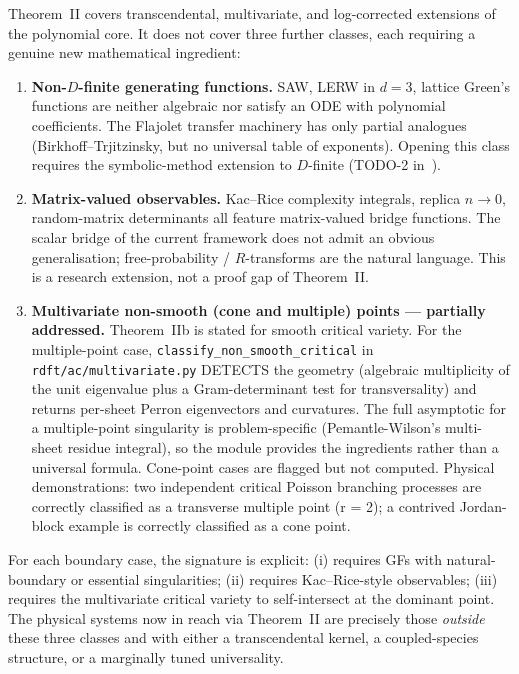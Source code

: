 \documentclass[11pt,a4paper]{article}
\theoremstyle{plain}
\theoremstyle{definition}
\begin{document}
Theorem~II covers transcendental, multivariate, and log-corrected
extensions of the polynomial core.  It does not cover three further
classes, each requiring a genuine new mathematical ingredient:

\begin{enumerate}[label=(\roman*), leftmargin=1.8em, itemsep=2pt]
  \item \textbf{Non-$D$-finite generating functions.}  SAW, LERW
    in $d=3$, lattice Green's functions are neither algebraic nor
    satisfy an ODE with polynomial coefficients.  The Flajolet
    transfer machinery has only partial analogues
    (Birkhoff--Trjitzinsky, but no universal table of exponents).
    Opening this class requires the symbolic-method extension to
    $D$-finite (TODO-2 in~\citep{AmarteifioProblems2026}).

  \item \textbf{Matrix-valued observables.}  Kac--Rice complexity
    integrals, replica $n \to 0$, random-matrix determinants all
    feature matrix-valued bridge functions.  The scalar bridge of
    the current framework does not admit an obvious generalisation;
    free-probability / $R$-transforms are the natural language.  This
    is a research extension, not a proof gap of Theorem~II.

  \item \textbf{Multivariate non-smooth (cone and multiple) points ---
    partially addressed.}  Theorem~IIb is stated for smooth critical
    variety.  For the multiple-point case, \texttt{classify\_non\_smooth\_critical}
    in \texttt{rdft/ac/multivariate.py} DETECTS the geometry (algebraic
    multiplicity of the unit eigenvalue plus a Gram-determinant test for
    transversality) and returns per-sheet Perron eigenvectors and
    curvatures.  The full asymptotic for a multiple-point singularity
    is problem-specific (Pemantle-Wilson's multi-sheet residue integral),
    so the module provides the ingredients rather than a universal
    formula.  Cone-point cases are flagged but not computed.  Physical
    demonstrations: two independent critical Poisson branching
    processes are correctly classified as a transverse multiple point
    (r = 2); a contrived Jordan-block example is correctly classified
    as a cone point.
\end{enumerate}

For each boundary case, the signature is explicit: (i) requires GFs
with natural-boundary or essential singularities; (ii) requires
Kac--Rice-style observables; (iii) requires the multivariate
critical variety to self-intersect at the dominant point.  The
physical systems now in reach via Theorem~II are precisely those
\emph{outside} these three classes and with either a transcendental
kernel, a coupled-species structure, or a marginally tuned
universality.
\end{document}
